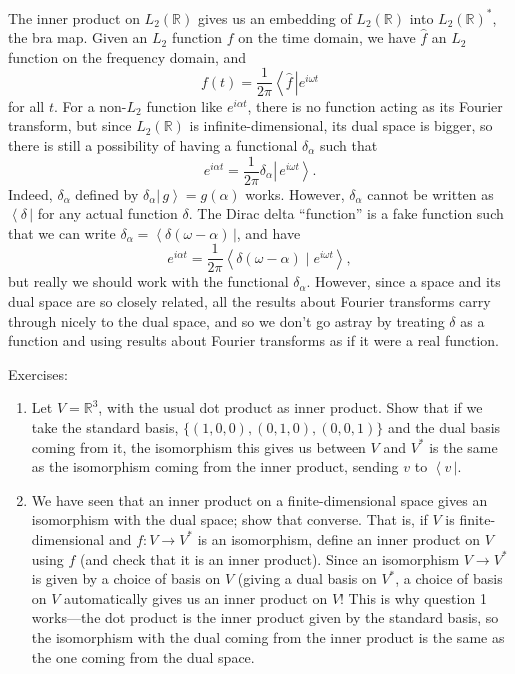 \documentclass{article}
\newcommand{\bra}[1]{\left\langle #1 \,\right|}
\newcommand{\ket}[1]{\left|\, #1\right\rangle}
\newcommand{\braket}[2]{\left\langle #1 \mid #2 \right\rangle}
\begin{document}
The inner product on $L_2(\mathbb{R})$ gives us an embedding of $L_2(\mathbb{R})$ into $L_2(\mathbb{R})^*$, the bra map. Given an $L_2$ function $f$ on the time domain, we have $\hat{f}$ an $L_2$ function on the frequency domain, and
\[f(t)=\frac{1}{2\pi}\bra{\hat{f}}{e^{i\omega t}}\]
for all $t$. For a non-$L_2$ function like $e^{i\alpha t}$, there is no function acting as its Fourier transform, but since $L_2(\mathbb{R})$ is infinite-dimensional, its dual space is bigger, so there is still a possibility of having a functional $\delta_\alpha$ such that
\[e^{i\alpha t}=\frac{1}{2\pi}\delta_\alpha\ket{e^{i\omega t}}.\]
Indeed, $\delta_\alpha$ defined by $\delta_\alpha\ket{g}=g(\alpha)$ works. However, $\delta_\alpha$ cannot be written as $\bra{\delta}$ for any actual function $\delta$. The Dirac delta ``function'' is a fake function such that we can write $\delta_\alpha=\bra{\delta(\omega-\alpha)}$, and have
\[e^{i\alpha t}=\frac{1}{2\pi}\braket{\delta(\omega-\alpha)}{e^{i\omega t}},\]
but really we should work with the functional $\delta_\alpha$. However, since a space and its dual space are so closely related, all the results about Fourier transforms carry through nicely to the dual space, and so we don't go astray by treating $\delta$ as a function and using results about Fourier transforms as if it were a real function.\bigskip


Exercises:

\begin{enumerate}
	\item Let $V=\mathbb{R}^3$, with the usual dot product as inner product. Show that if we take the standard basis, $\{(1,0,0), (0,1,0),(0,0,1)\}$ and the dual basis coming from it, the isomorphism this gives us between $V$ and $V^*$ is the same as the isomorphism coming from the inner product, sending $v$ to $\bra{v}$.
	\item We have seen that an inner product on a finite-dimensional space gives an isomorphism with the dual space; show that converse. That is, if $V$ is finite-dimensional and $f:V\to V^*$ is an isomorphism, define an inner product on $V$ using $f$ (and check that it is an inner product). Since an isomorphism $V\to V^*$ is given by a choice of basis on $V$ (giving a dual basis on $V^*$, a choice of basis on $V$ automatically gives us an inner product on $V$! This is why question 1 works---the dot product is the inner product given by the standard basis, so the isomorphism with the dual coming from the inner product is the same as the one coming from the dual space.
\end{enumerate}
\end{document}
